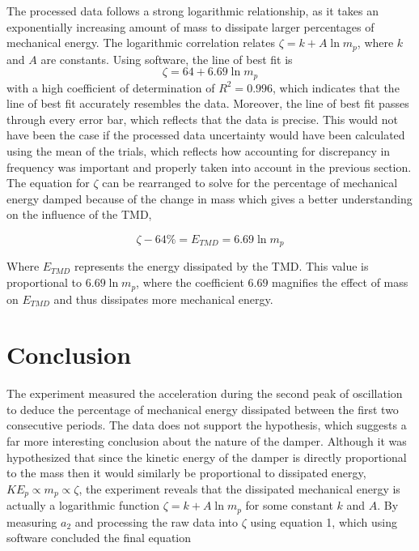 \documentclass[11pt]{article}
\begin{document}
The processed data follows a strong logarithmic relationship, as it takes an exponentially increasing amount of mass to dissipate larger percentages of mechanical energy. The logarithmic correlation relates $\zeta = k + A\ln{m_p}$, where $k$ and $A$ are constants. Using software, the line of best fit is $$\zeta = 64 + 6.69\ln m_p$$ with a high coefficient of determination of $R^2 = 0.996$, which indicates that the line of best fit accurately resembles the data. Moreover, the line of best fit passes through every error bar, which reflects that the data is precise. This would not have been the case if the processed data uncertainty would have been calculated using the mean of the trials, which reflects how accounting for discrepancy in frequency was important and properly taken into account in the previous section.\\


The equation for $\zeta$ can be rearranged to solve for the percentage of mechanical energy damped because of the change in mass which gives a better understanding on the influence of the TMD, 

$$ \zeta - 64\% = E_{TMD} = 6.69 \ln m_p$$

Where $E_{TMD}$ represents the energy dissipated by the TMD. This value is proportional to $6.69 \ln m_p$, where the coefficient $6.69$ magnifies the effect of mass on $E_{TMD}$ and thus dissipates more mechanical energy.

\newpage

\section{Conclusion}

The experiment measured the acceleration during the second peak of oscillation to deduce the percentage of mechanical energy dissipated between the first two consecutive periods. The data does not support the hypothesis, which suggests a far more interesting conclusion about the nature of the damper. Although it was hypothesized that since the kinetic energy of the damper is directly proportional to the mass then it would similarly be proportional to dissipated energy, $KE_p \propto m_p \propto \zeta$, the experiment reveals that the dissipated mechanical energy is actually a logarithmic function $\zeta = k + A\ln m_p$ for some constant $k$ and $A$. By measuring $a_2$ and processing the raw data into $\zeta$ using equation 1, which using software concluded the final equation
\end{document}
